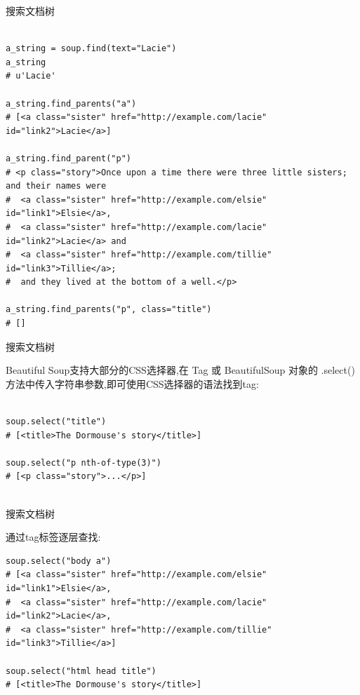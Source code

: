 \documentclass{beamer}
\begin{document}
\begin{frame}[t,fragile]{搜索文档树}


\begin{verbatim}

a_string = soup.find(text="Lacie")
a_string
# u'Lacie'

a_string.find_parents("a")
# [<a class="sister" href="http://example.com/lacie" id="link2">Lacie</a>]

a_string.find_parent("p")
# <p class="story">Once upon a time there were three little sisters; and their names were
#  <a class="sister" href="http://example.com/elsie" id="link1">Elsie</a>,
#  <a class="sister" href="http://example.com/lacie" id="link2">Lacie</a> and
#  <a class="sister" href="http://example.com/tillie" id="link3">Tillie</a>;
#  and they lived at the bottom of a well.</p>

a_string.find_parents("p", class="title")
# []

\end{verbatim}


\end{frame}

\begin{frame}[t,fragile]{搜索文档树}

Beautiful Soup支持大部分的CSS选择器,在 Tag 或 BeautifulSoup 对象的 .select() 方法中传入字符串参数,即可使用CSS选择器的语法找到tag:

\begin{verbatim}

soup.select("title")
# [<title>The Dormouse's story</title>]

soup.select("p nth-of-type(3)")
# [<p class="story">...</p>]


\end{verbatim}


\end{frame}

\begin{frame}[t,fragile]{搜索文档树}

通过tag标签逐层查找:

\begin{verbatim}
soup.select("body a")
# [<a class="sister" href="http://example.com/elsie" id="link1">Elsie</a>,
#  <a class="sister" href="http://example.com/lacie"  id="link2">Lacie</a>,
#  <a class="sister" href="http://example.com/tillie" id="link3">Tillie</a>]

soup.select("html head title")
# [<title>The Dormouse's story</title>]


\end{verbatim}


\end{frame}
\end{document}
